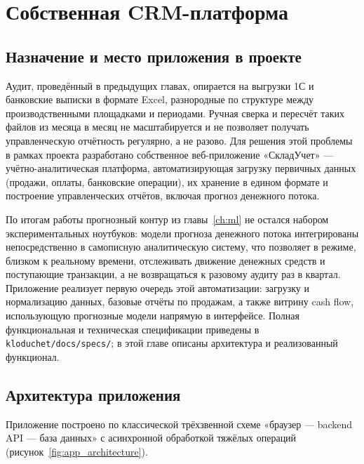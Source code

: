 \chapter{Собственная CRM-платформа}
\label{ch:app}

\section{Назначение и место приложения в проекте}

Аудит, проведённый в предыдущих главах, опирается на выгрузки 1С и банковские выписки в формате Excel, разнородные по структуре между производственными площадками и периодами. Ручная сверка и пересчёт таких файлов из месяца в месяц не масштабируется и не позволяет получать управленческую отчётность регулярно, а не разово. Для решения этой проблемы в рамках проекта разработано собственное веб-приложение «СкладУчет» --- учётно-аналитическая платформа, автоматизирующая загрузку первичных данных (продажи, оплаты, банковские операции), их хранение в едином формате и построение управленческих отчётов, включая прогноз денежного потока.

По итогам работы прогнозный контур из главы~\ref{ch:ml} не остался набором экспериментальных ноутбуков: модели прогноза денежного потока интегрированы непосредственно в самописную аналитическую систему, что позволяет в режиме, близком к реальному времени, отслеживать движение денежных средств и поступающие транзакции, а не возвращаться к разовому аудиту раз в квартал. Приложение реализует первую очередь этой автоматизации: загрузку и нормализацию данных, базовые отчёты по продажам, а также витрину cash flow, использующую прогнозные модели напрямую в интерфейсе. Полная функциональная и техническая спецификации приведены в \texttt{kloduchet/docs/specs/}; в этой главе описаны архитектура и реализованный функционал.

\section{Архитектура приложения}

Приложение построено по классической трёхзвенной схеме «браузер --- backend API --- база данных» с асинхронной обработкой тяжёлых операций (рисунок~\ref{fig:app_architecture}).


